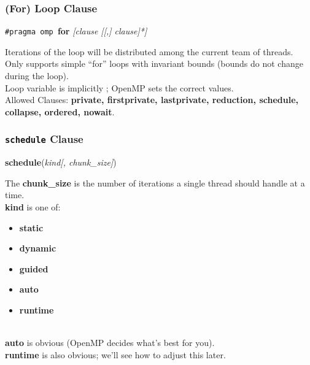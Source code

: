 \documentclass[aspectratio=43]{beamer}
\newenvironment{changemargin}[1]{%
  \begin{list}{}{%
    \setlength{\topsep}{0pt}%
    \setlength{\leftmargin}{#1}%
    \setlength{\rightmargin}{1em}
    \setlength{\listparindent}{\parindent}%
    \setlength{\itemindent}{\parindent}%
    \setlength{\parsep}{\parskip}%
  }%
  \item[]}{\end{list}}
\begin{document}
\begin{frame}[fragile]
  \frametitle{(For) Loop Clause}

  \begin{changemargin}{2.5cm}
  \begin{center}
    {\tt \#pragma omp }{\bf for} {\it [clause [[,] clause]*]}
  \end{center}

    Iterations of the loop will be distributed among the
      current team of threads.\\[1em]
    Only supports simple ``for'' loops with invariant bounds (bounds do
      not change during the loop).\\[1em]
    Loop variable is implicitly ; OpenMP sets the
      correct values.\\[2em]

  Allowed Clauses: {\bf private, firstprivate, lastprivate, reduction, schedule,
    collapse, ordered, nowait}.
  \end{changemargin}

\end{frame}

\begin{frame}
  \frametitle{{\tt schedule} Clause}

  \begin{changemargin}{1.5cm}
  \begin{center}
    {\bf schedule}({\it kind[, chunk\_size]})
  \end{center}

    The {\bf chunk\_size} is the number of iterations a single thread
      should handle at a time.\\[1em]
    {\bf kind} is one of:
      \begin{itemize}
        \item {\bf static}
        \item {\bf dynamic}
        \item {\bf guided}
        \item {\bf auto}
        \item {\bf runtime}
      \end{itemize}~\\
    {\bf auto} is obvious (OpenMP decides what's best for you).\\
    {\bf runtime} is also obvious; we'll see how to adjust this later.\\
  \end{changemargin}

\end{frame}
\end{document}
